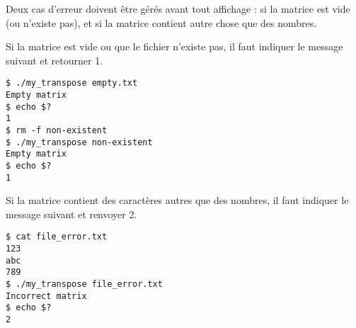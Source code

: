 \bigskip

\noindent Deux cas d'erreur doivent être gérés avant tout affichage : si la matrice est vide (ou n'existe pas), et si la matrice contient autre chose que des nombres.

\noindent Si la matrice est vide ou que le fichier n'existe pas, il faut indiquer le message suivant et retourner 1.

\bigskip

\noindent {}

\bigskip

\lstset{language=sh}
\begin{lstlisting}[frame=single,title={Cas d'erreur 1},morekeywords={rm}]
$ ./my_transpose empty.txt
Empty matrix
$ echo $?
1
$ rm -f non-existent
$ ./my_transpose non-existent
Empty matrix
$ echo $?
1
\end{lstlisting}

\noindent Si la matrice contient des caractères autres que des nombres, il faut indiquer le message suivant et renvoyer 2.

\bigskip

\noindent {}

\vfillLast


\lstset{language=sh}
\begin{lstlisting}[frame=single,title={Cas d'erreur 2}]
$ cat file_error.txt
123
abc
789
$ ./my_transpose file_error.txt
Incorrect matrix
$ echo $?
2
\end{lstlisting}

%
